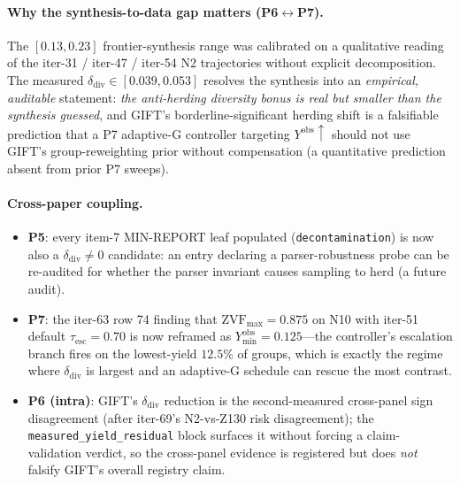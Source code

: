 \paragraph{Why the synthesis-to-data gap matters (P6$\leftrightarrow$P7).}
The $[0.13, 0.23]$ frontier-synthesis range was calibrated on a
qualitative reading of the iter-31 / iter-47 / iter-54 N2 trajectories
without explicit decomposition. The measured
$\delta_{\mathrm{div}}\in[0.039, 0.053]$ resolves the synthesis into
an \emph{empirical, auditable} statement: \emph{the anti-herding
diversity bonus is real but smaller than the synthesis guessed}, and
GIFT's borderline-significant herding shift is a falsifiable
prediction that a P7 adaptive-G controller targeting
$Y^{\mathrm{obs}}\uparrow$ should not use GIFT's group-reweighting
prior without compensation (a quantitative prediction absent from
prior P7 sweeps).

\paragraph{Cross-paper coupling.}
\begin{itemize}
  \item \textbf{P5}: every item-7 MIN-REPORT leaf populated
        (\texttt{decontamination}) is now also a
        $\delta_{\mathrm{div}}\neq 0$ candidate: an entry declaring a
        parser-robustness probe can be re-audited for whether the
        parser invariant causes sampling to herd (a future audit).
  \item \textbf{P7}: the iter-63 row 74 finding that
        $\mathrm{ZVF}_{\max}=0.875$ on N10 with iter-51 default
        $\tau_{\mathrm{esc}}=0.70$ is now reframed as
        $Y^{\mathrm{obs}}_{\min}=0.125$---the controller's
        escalation branch fires on the lowest-yield $12.5\%$ of
        groups, which is exactly the regime where $\delta_{\mathrm{div}}$
        is largest and an adaptive-G schedule can rescue the most
        contrast.
  \item \textbf{P6 (intra)}: GIFT's $\delta_{\mathrm{div}}$ reduction
        is the second-measured cross-panel sign disagreement (after
        iter-69's N2-vs-Z130 risk disagreement); the
        \texttt{measured\_yield\_residual} block surfaces it without
        forcing a claim-validation verdict, so the cross-panel
        evidence is registered but does \emph{not} falsify GIFT's
        overall registry claim.
\end{itemize}


